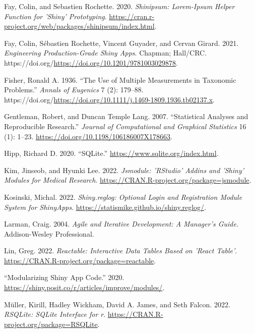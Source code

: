 \begin{CSLReferences}{1}{0}
\leavevmode{}%
Fay, Colin, and Sebastien Rochette. 2020. \emph{Shinipsum: Lorem-Ipsum Helper Function for 'Shiny' Prototyping}. \url{https://cran.r-project.org/web/packages/shinipsum/index.html}.

\leavevmode{}%
Fay, Colin, Sébastien Rochette, Vincent Guyader, and Cervan Girard. 2021. \emph{Engineering Production-Grade Shiny Apps}. Chapman; Hall/CRC. https://doi.org/\url{https://doi.org/10.1201/9781003029878}.

\leavevmode{}%
Fisher, Ronald A. 1936. {``The Use of Multiple Measurements in Taxonomic Problems.''} \emph{Annals of Eugenics} 7 (2): 179--88. https://doi.org/\url{https://doi.org/10.1111/j.1469-1809.1936.tb02137.x}.

\leavevmode{}%
Gentleman, Robert, and Duncan Temple Lang. 2007. {``Statistical Analyses and Reproducible Research.''} \emph{Journal of Computational and Graphical Statistics} 16 (1): 1--23. \url{https://doi.org/10.1198/106186007X178663}.

\leavevmode{}%
Hipp, Richard D. 2020. {``{SQLite}.''} \url{https://www.sqlite.org/index.html}.

\leavevmode{}%
Kim, Jinseob, and Hyunki Lee. 2022. \emph{Jsmodule: 'RStudio' Addins and 'Shiny' Modules for Medical Research}. \url{https://CRAN.R-project.org/package=jsmodule}.

\leavevmode{}%
Kosinski, Michal. 2022. \emph{Shiny.reglog: Optional Login and Registration Module System for ShinyApps}. \url{https://statismike.github.io/shiny.reglog/}.

\leavevmode{}%
Larman, Craig. 2004. \emph{Agile and Iterative Development: A Manager's Guide}. Addison-Wesley Professional.

\leavevmode{}%
Lin, Greg. 2022. \emph{Reactable: Interactive Data Tables Based on 'React Table'}. \url{https://CRAN.R-project.org/package=reactable}.

\leavevmode{}%
{``Modularizing Shiny App Code.''} 2020. \url{https://shiny.posit.co/r/articles/improve/modules/}.

\leavevmode{}%
Müller, Kirill, Hadley Wickham, David A. James, and Seth Falcon. 2022. \emph{RSQLite: SQLite Interface for r}. \url{https://CRAN.R-project.org/package=RSQLite}.


\end{CSLReferences}
